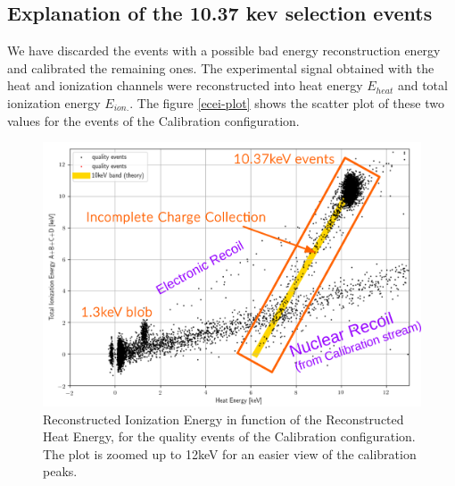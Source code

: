 \subsection{Explanation of the 10.37 kev selection events}

We have discarded the events with a possible bad energy reconstruction energy and calibrated the remaining ones. The experimental signal obtained with the heat and ionization channels were reconstructed into heat energy $E_{heat}$ and total ionization energy $E_{ion.}$. The figure \ref{ecei-plot} shows the scatter plot of these two values for the events of the Calibration configuration.

\begin{figure}
\centering
\includegraphics[width=\linewidth,]{Figures/Neutron/ecei_plot.png}
\caption{Reconstructed Ionization Energy in function of the Reconstructed Heat Energy, for the quality events of the Calibration configuration. The plot is zoomed up to 12keV for an easier view of the calibration peaks. }
\label{fig:ecei-plot}
\end{figure}

